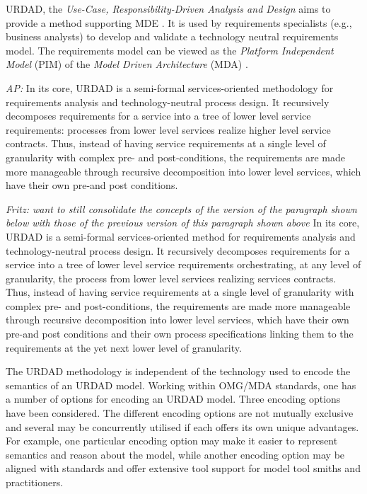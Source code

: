 URDAD, the {\em Use-Case, Responsibility-Driven Analysis and Design} \cite{fritz_solms_technology_2007} aims to provide a method supporting MDE \cite{solms_urdad_2010}. It is used by requirements specialists (e.g., business analysts) to develop and validate a technology neutral requirements model. The requirements model can be viewed as the {\em Platform Independent Model} (PIM) of the {\em Model Driven Architecture} (MDA) \cite{solms_urdad_2010}.

\emph{AP:}
In its core, URDAD is a semi-formal services-oriented methodology for requirements analysis and technology-neutral process design. It recursively decomposes requirements for a service into a tree of lower level service requirements: processes from lower level services realize higher level service contracts. Thus, instead of having service requirements at a single level of granularity with complex pre- and post-conditions, the requirements are made more manageable through recursive decomposition into lower level services, which have their own pre-and post conditions.

\emph{Fritz: want to still consolidate the concepts of the version of the paragraph shown below with those of the previous version of this paragraph shown above}
In its core, URDAD is a semi-formal services-oriented method for requirements analysis and technology-neutral process design. It recursively decomposes requirements for a service into a tree of lower level service requirements orchestrating, at any level of granularity, the process from lower level services realizing services contracts. Thus, instead of having service requirements at a single level of granularity with complex pre- and post-conditions, the requirements are made more manageable through recursive decomposition into lower level services, which have their own pre-and post conditions and their own process specifications linking them to the requirements at the yet next lower level of granularity.

The URDAD methodology is independent of the technology used to encode the semantics of an URDAD model. Working within OMG/MDA standards, one has a number of options for encoding an URDAD model. Three encoding options have been considered. The different encoding options are not mutually exclusive and several may be concurrently utilised if each offers its own unique advantages. For example, one particular encoding option may make it easier to represent semantics and reason about the model, while another encoding option may be aligned with standards and offer extensive tool support for model tool smiths and practitioners. 

